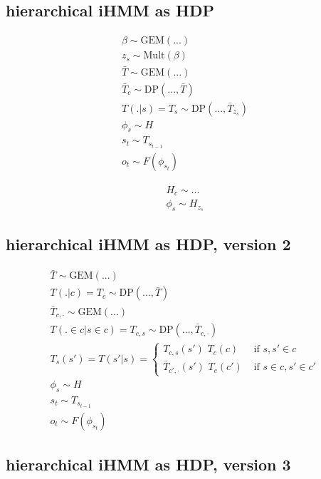 \documentclass[11pt]{article}
\begin{document}
\subsection{hierarchical iHMM as HDP}


\begin{align*}
\beta \sim \text{GEM}(...) \\
z_s \sim \text{Mult}(\beta) \\
\bar{T} \sim \text{GEM}(...) \\
\bar{T}_c \sim \text{DP}(..., \bar{T}) \\
T(.|s) = T_s \sim \text{DP}(..., \bar{T}_{z_s}) \\
\phi_s \sim H \\
s_t \sim T_{s_{t-1}} \\
o_t \sim F(\phi_{s_t})
\end{align*}


\begin{align*}
H_c \sim ... \\
\phi_s \sim H_{z_s}
\end{align*}


\subsection{hierarchical iHMM as HDP, version 2}



\begin{align*}
\bar{T} \sim \text{GEM}(...) \\
T(.|c) = T_c \sim \text{DP}(..., \bar{T}) \\
\bar{T}_{c,\cdot} \sim \text{GEM}(...) \\
T(. \in c | s \in c) = T_{c,s} \sim \text{DP}(..., \bar{T}_{c,\cdot}) \\
T_s(s') = T(s'|s) = \begin{cases}  T_{c,s}(s') \,\, T_c(c) & \text{ if } s, s' \in c \\  \bar{T}_{c',\cdot}(s') \,\, T_c(c') & \text{ if } s \in c, s' \in c'  \end{cases} \\
\phi_s \sim H \\
s_t \sim T_{s_{t-1}} \\
o_t \sim F(\phi_{s_t})
\end{align*}


\subsection{hierarchical iHMM as HDP, version 3}
\end{document}

